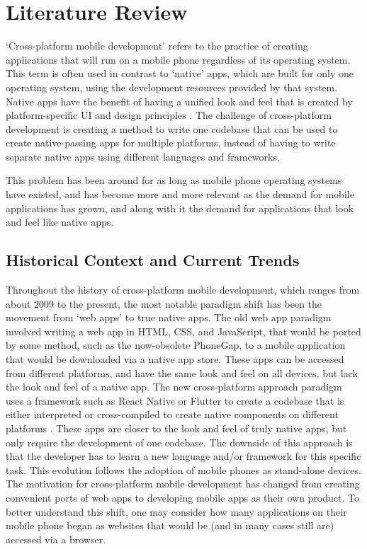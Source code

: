 \section{Literature Review} \label{literature_review}

`Cross-platform mobile development' refers to the practice of creating applications that will run on a mobile phone regardless of its operating system. This term is often used in contrast to `native' apps, which are built for only one operating system, using the development resources provided by that system. Native apps have the benefit of having a unified look and feel that is created by platform-specific UI and design principles \cite{Apple-HGI, Android-Developers}. The challenge of cross-platform development is creating a method to write one codebase that can be used to create native-passing apps for multiple platforms, instead of having to write separate native apps using different languages and frameworks. 

This problem has been around for as long as mobile phone operating systems have existed, and has become more and more relevant as the demand for mobile applications has grown, and along with it the demand for applications that look and feel like native apps.

\subsection{Historical Context and Current Trends}

Throughout the history of cross-platform mobile development, which ranges from about 2009 to the present, the most notable paradigm shift has been the movement from `web apps' to true native apps. The old web app paradigm involved writing a web app in HTML, CSS, and JavaScript, that would be ported by some method, such as the now-obsolete PhoneGap, to a mobile application that would be downloaded via a native app store\cite{PhoneGap, Gangundi-2010}. These apps can be accessed from different platforms, and have the same look and feel on all devices, but lack the look and feel of a native app. The new cross-platform approach paradigm uses a framework such as React Native or Flutter to create a codebase that is either interpreted or cross-compiled to create native components on different platforms \cite{Google-Trends}. These apps are closer to the look and feel of truly native apps, but only require the development of one codebase. The downside of this approach is that the developer has to learn a new language and/or framework for this specific task. This evolution follows the adoption of mobile phones as stand-alone devices. The motivation for cross-platform mobile development has changed from creating convenient ports of web apps to developing mobile apps as their own product. To better understand this shift, one may consider how many applications on their mobile phone began as websites that would be (and in many cases still are) accessed via a browser. 


